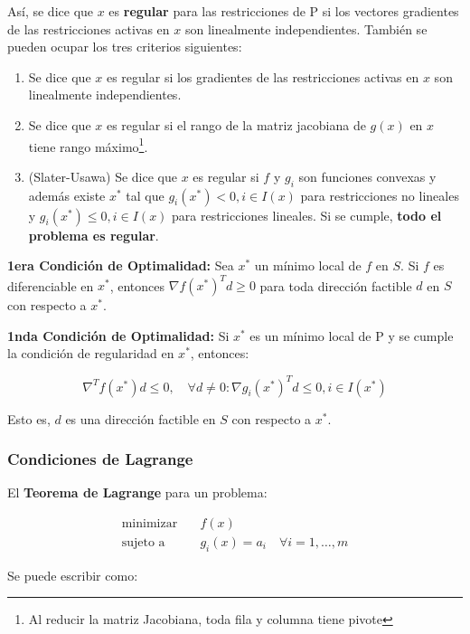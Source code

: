 \documentclass{article}
\begin{document}
Así, se dice que $x$ es \textbf{regular} para las restricciones de P si los vectores gradientes de las restricciones activas en $x$ son linealmente independientes. También se pueden ocupar los tres criterios siguientes:

\begin{enumerate}
    \item Se dice que $x$ es regular si los gradientes de las restricciones activas en $x$ son linealmente independientes.
    \item Se dice que $x$ es regular si el rango de la matriz jacobiana de $g(x)$ en $x$ tiene rango máximo\footnote{Al reducir la matriz Jacobiana, toda fila y columna tiene pivote}.
    \item (Slater-Usawa) Se dice que $x$ es regular si $f$ y $g_i$ son funciones convexas y además existe $x^*$ tal que $g_i(x^*) < 0, i \in I(x)$ para restricciones no lineales y $g_i(x^*) \leq 0, i \in I(x)$ para restricciones lineales. Si se cumple, \textbf{todo el problema es regular}.
\end{enumerate}

\textbf{1era Condición de Optimalidad:} Sea $x^*$ un mínimo local de $f$ en $S$. Si $f$ es diferenciable en $x^*$, entonces $\nabla f(x^*)^T d \geq 0$ para toda dirección factible $d$ en $S$ con respecto a $x^*$.

\textbf{1nda Condición de Optimalidad:} Si $x^*$ es un mínimo local de P y se cumple la condición de regularidad en $x^*$, entonces:

\begin{equation*}
    \nabla^T f(x^*) d \leq 0, \quad \forall d\neq 0: \nabla g_i(x^*)^T d \leq 0, i\in I(x^*)
\end{equation*}

Esto es, $d$ es una dirección factible en $S$ con respecto a $x^*$.

\subsubsection{Condiciones de Lagrange}

El \textbf{Teorema de Lagrange} para un problema:

\begin{align*}
    \text{minimizar} \quad & f(x)                                        \\
    \text{sujeto a} \quad  & g_i(x) = a_i \quad \forall i = 1, \ldots, m
\end{align*}

Se puede escribir como:
\end{document}
